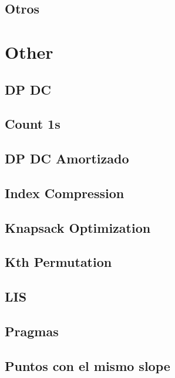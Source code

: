 \subsection{	Otros}
\raggedbottom
\hrulefill

\section{Other}
\subsection{	DP DC}
\raggedbottom
\hrulefill
\subsection{	Count 1s}
\raggedbottom
\hrulefill
\subsection{	DP DC Amortizado}
\raggedbottom
\hrulefill
\subsection{	Index Compression}
\raggedbottom
\hrulefill
\subsection{	Knapsack Optimization}
\raggedbottom
\hrulefill
\subsection{	Kth Permutation}
\raggedbottom
\hrulefill
\subsection{	LIS}
\raggedbottom
\hrulefill
\subsection{	Pragmas}
\raggedbottom
\hrulefill
\subsection{	Puntos con el mismo slope}
\raggedbottom
\hrulefill

